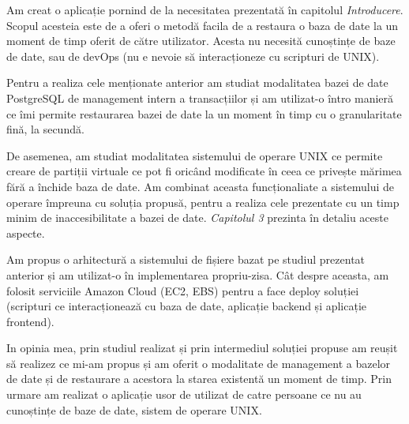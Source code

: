 Am creat o aplicație pornind de la necesitatea prezentată în capitolul \textit{Introducere}. Scopul acesteia este de a oferi o metodă facila de a restaura o baza de date la un moment de timp oferit de către utilizator. Acesta nu necesită cunoștințe de baze de date, sau de devOps (nu e nevoie să interacționeze cu scripturi de UNIX).
\par
Pentru a realiza cele menționate anterior am studiat modalitatea bazei de date PostgreSQL de management intern a transacțiilor și am utilizat-o întro manieră ce îmi permite restaurarea bazei de date la un moment în timp cu o granularitate fină, la secundă.
\par
De asemenea, am studiat modalitatea sistemului de operare UNIX ce permite creare de partiții virtuale ce pot fi oricând modificate în ceea ce privește mărimea fără a închide baza de date. Am combinat aceasta funcționaliate a sistemului de operare împreuna cu soluția propusă, pentru a realiza cele prezentate cu un timp minim de inaccesibilitate a bazei de date. \textit{Capitolul 3} prezinta în detaliu aceste aspecte.
\par
Am propus o arhitectură a sistemului de fișiere bazat pe studiul prezentat anterior și am utilizat-o în implementarea propriu-zisa. Cât despre aceasta, am folosit serviciile Amazon Cloud (EC2, EBS) pentru a face deploy soluției (scripturi ce interacționează cu baza de date, aplicație backend și aplicație frontend).
\par
In opinia mea, prin studiul realizat și prin intermediul soluției propuse am reușit să realizez ce mi-am propus și am oferit o modalitate de management a bazelor de date și de restaurare a acestora la starea existentă un moment de timp. Prin urmare am realizat o aplicație usor de utilizat de catre persoane ce nu au cunoștințe de baze de date, sistem de operare UNIX.